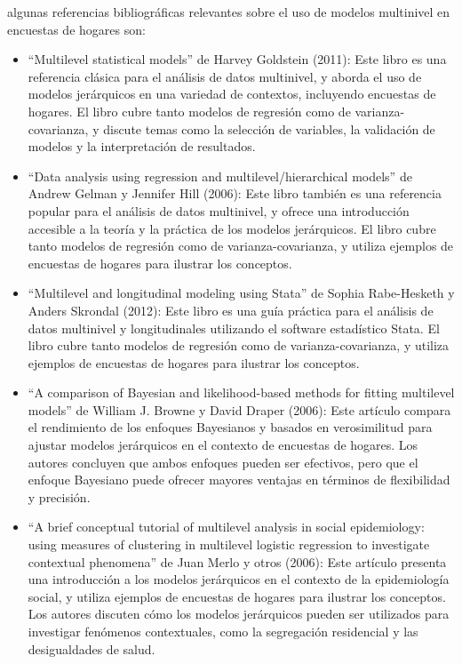 \documentclass[
  12pt,
]{book}
\begin{document}
algunas referencias bibliográficas relevantes sobre el uso de modelos multinivel en encuestas de hogares son:

\begin{itemize}
\item
  ``Multilevel statistical models'' de Harvey Goldstein (2011): Este libro es una referencia clásica para el análisis de datos multinivel, y aborda el uso de modelos jerárquicos en una variedad de contextos, incluyendo encuestas de hogares. El libro cubre tanto modelos de regresión como de varianza-covarianza, y discute temas como la selección de variables, la validación de modelos y la interpretación de resultados.
\item
  ``Data analysis using regression and multilevel/hierarchical models'' de Andrew Gelman y Jennifer Hill (2006): Este libro también es una referencia popular para el análisis de datos multinivel, y ofrece una introducción accesible a la teoría y la práctica de los modelos jerárquicos. El libro cubre tanto modelos de regresión como de varianza-covarianza, y utiliza ejemplos de encuestas de hogares para ilustrar los conceptos.
\item
  ``Multilevel and longitudinal modeling using Stata'' de Sophia Rabe-Hesketh y Anders Skrondal (2012): Este libro es una guía práctica para el análisis de datos multinivel y longitudinales utilizando el software estadístico Stata. El libro cubre tanto modelos de regresión como de varianza-covarianza, y utiliza ejemplos de encuestas de hogares para ilustrar los conceptos.
\item
  ``A comparison of Bayesian and likelihood-based methods for fitting multilevel models'' de William J. Browne y David Draper (2006): Este artículo compara el rendimiento de los enfoques Bayesianos y basados en verosimilitud para ajustar modelos jerárquicos en el contexto de encuestas de hogares. Los autores concluyen que ambos enfoques pueden ser efectivos, pero que el enfoque Bayesiano puede ofrecer mayores ventajas en términos de flexibilidad y precisión.
\item
  ``A brief conceptual tutorial of multilevel analysis in social epidemiology: using measures of clustering in multilevel logistic regression to investigate contextual phenomena'' de Juan Merlo y otros (2006): Este artículo presenta una introducción a los modelos jerárquicos en el contexto de la epidemiología social, y utiliza ejemplos de encuestas de hogares para ilustrar los conceptos. Los autores discuten cómo los modelos jerárquicos pueden ser utilizados para investigar fenómenos contextuales, como la segregación residencial y las desigualdades de salud.
\end{itemize}
\end{document}
